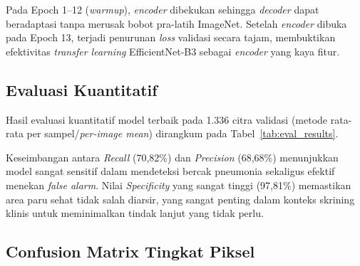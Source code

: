 \documentclass[12pt,a4paper,twocolumn]{article}
\begin{document}
Pada Epoch 1--12 (\textit{warmup}), \textit{encoder} dibekukan sehingga
\textit{decoder} dapat beradaptasi tanpa merusak bobot pra-latih ImageNet.
Setelah \textit{encoder} dibuka pada Epoch 13, terjadi penurunan \textit{loss}
validasi secara tajam, membuktikan efektivitas \textit{transfer learning}
EfficientNet-B3 sebagai \textit{encoder} yang kaya fitur.

\subsection{Evaluasi Kuantitatif}

Hasil evaluasi kuantitatif model terbaik pada 1.336 citra validasi (metode
rata-rata per sampel/\textit{per-image mean}) dirangkum pada
Tabel~\ref{tab:eval_results}.

\begin{table}[H]
  \centering
  \caption{Hasil Evaluasi Kuantitatif Model U-Net sCSE (Epoch 46).}
  \label{tab:eval_results}
\end{table}

Keseimbangan antara \textit{Recall} (70,82\%) dan \textit{Precision} (68,68\%)
menunjukkan model sangat sensitif dalam mendeteksi bercak pneumonia sekaligus
efektif menekan \textit{false alarm}. Nilai \textit{Specificity} yang sangat
tinggi (97,81\%) memastikan area paru sehat tidak salah diarsir, yang sangat
penting dalam konteks skrining klinis untuk meminimalkan tindak lanjut yang
tidak perlu.

\subsection{Confusion Matrix Tingkat Piksel}
\end{document}
